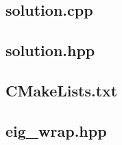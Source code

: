 \documentclass[a4paper, 12pt]{article}
\begin{document}
\subsection{solution.cpp} \label{subsec:solution.cpp}

\subsection{solution.hpp} \label{subsec:solution.hpp}


\subsection{CMakeLists.txt} \label{subsec:CMakeLists.txt}


\subsection{eig\_wrap.hpp} \label{subsec:eig_wrap.hpp}

\end{document}
